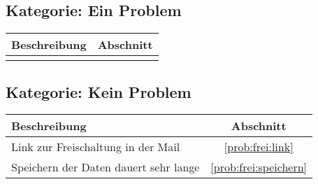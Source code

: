 \subsection*{Kategorie: Ein Problem}
\begin{tabular}{|p{12cm}|c|}
\hline
\textbf{Beschreibung} & \textbf{Abschnitt} \\
\hline\hline
 & \\
\hline
\end{tabular}

\subsection*{Kategorie: Kein Problem}
\begin{tabular}{|p{12cm}|c|}
\hline
\textbf{Beschreibung} & \textbf{Abschnitt} \\
\hline\hline
Link zur Freischaltung in der Mail & \ref{prob:frei:link}\\
Speichern der Daten dauert sehr lange & \ref{prob:frei:speichern}\\
\hline
\end{tabular}
